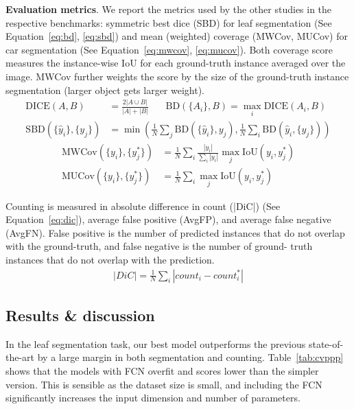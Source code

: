 \textbf{Evaluation metrics}. We report the  metrics used by the other studies
in the respective benchmarks: symmetric best dice (SBD) for leaf segmentation
(See Equation~\ref{eq:bd}, \ref{eq:sbd}) and mean (weighted) coverage (MWCov,
MUCov) for car segmentation (See Equation~\ref{eq:mwcov}, \ref{eq:mucov}). Both
coverage score measures the instance-wise IoU for each ground-truth instance
averaged over the image. MWCov further weights the score by the size of the
ground-truth instance segmentation (larger object gets larger weight).
\vspace{-3pt}
\begin{align}
\label{eq:bd}
\text{DICE}(A, B) &= \frac{2 |A \cup B|}{|A| + |B|} \ \ \ \ \ \ \ \
\text{BD}(\{A_i\}, B) = \max_{i} \text{DICE}(A_i, B) \\
\label{eq:sbd}
\text{SBD}(\{\hat{y}_i\}, \{y_j\}) &= 
\min \left(\frac{1}{N} \sum_j \text{BD}(\{\hat{y}_i\}, y_j), \frac{1}{N}
\sum_i \text{BD}(\hat{y}_i, \{y_j\}) \right)
\end{align}
\vspace{-12pt}
\begin{align}
\label{eq:mwcov}
\text{MWCov}(\{y_i\}, \{y_j^*\}) &= \frac{1}{N} \sum_i 
\frac{|y_i|}{\sum_i |y_i|} \max_j
\text{IoU}(y_i, y_j^*)\\
\label{eq:mucov}
\text{MUCov}(\{y_i\}, \{y_j^*\}) &= \frac{1}{N} \sum_i 
\max_j \text{IoU}(y_i, y_j^*)
\end{align}

Counting is measured in absolute difference in count (|DiC|) (See
Equation~\ref{eq:dic}), average false positive (AvgFP), and average false
negative (AvgFN). False positive is the number of predicted instances that do
not overlap with the ground-truth, and false negative is the number of ground-
truth instances that do not overlap with the prediction.
\vspace{-3pt}
\begin{align}
\label{eq:dic}
|DiC| = \frac{1}{N}\sum_i |count_i - count_i^*|
\end{align}
\vspace{-12pt}

\subsection{Results \& discussion}
\vspace{-3pt}
In the leaf segmentation task, our best model outperforms the previous 
state-of-the-art by a large margin in both segmentation and counting.
Table~\ref{tab:cvppp} shows that the models with FCN overfit and 
scores lower than the simpler version. This is sensible as the dataset size
is small, and including the FCN significantly increases the input dimension and
number of parameters.

